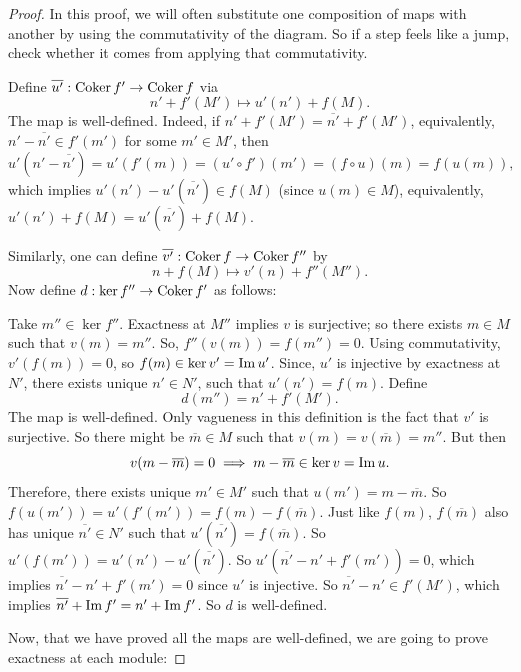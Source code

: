 \begin{proof}
    In this proof, we will often substitute one composition of maps with another by using the commutativity of the diagram. So if a step feels like a jump, check whether it comes from applying that commutativity.

    Define \( \overline{u'}: \operatorname{Coker} f' \to \operatorname{Coker} f \) via
    \[
        n' + f'(M') \mapsto u'(n') + f(M).
    \]
    The map is well-defined. Indeed, if \( n' + f'(M') = \overline{n'} + f'(M') \), equivalently, \( n' - \overline{n'} \in f'(m')\) for some \( m' \in M' \), then
    \[ 
        u'(n' - \overline{n'}) = u'(f'(m)) = (u' \circ f')(m') = (f \circ u)(m) = f(u(m)),
    \]
    which implies \( u'(n') - u'(\overline{n'}) \in f(M) \) (since \( u(m) \in M \)), equivalently, \( u'(n') + f(M) = u'(\overline{n'}) + f(M)\).

    Similarly, one can define \( \overline{v'}: \operatorname{Coker} f \to \operatorname{Coker} f'' \) by
    \[
        n + f(M) \mapsto v'(n) + f''(M'').
    \]
    Now define \( d: \ker f'' \to \operatorname{Coker} f' \) as follows:

    Take \( m'' \in \ker f'' \). Exactness at \( M'' \) implies  \( v \) is surjective; so there exists  \( m \in M \) such that  \( v(m) = m'' \). So,  \( f''(v(m)) = f(m'') = 0 \). Using commutativity,  \( v' ( f(m)) = 0 \), so  \( f(m) \in \ker v' = \operatorname{Im} u'\). Since, \( u' \) is injective by exactness at  \( N' \), there exists unique  \( n' \in N' \), such that  \( u'(n') = f(m) \). Define
    \[
        d(m'') = n' + f'(M').
    \]
    The map is well-defined. Only vagueness in this definition is the fact that \( v' \) is surjective. So there might be \( \overline{m} \in M \) such that \( v(m) = v(\overline{m}) = m'' \). But then
    \[
        v(m - \overline{m}) = 0 \implies m - \overline{m} \in \ker v = \operatorname{Im} u.
    \]
    Therefore, there exists unique \( m' \in M'\) such that  \( u(m') = m - \overline{m} \). So \( f(u(m')) = u'(f'(m')) = f(m) - f(\overline{m}) \). Just like \( f(m) \),  \( f(\overline{m}) \) also has unique \( \overline{n'} \in N' \) such that \( u'(\overline{n'}) = f(\overline{m}) \). So \( u'(f(m')) = u'(n') - u'(\overline{n'}) \). So \( u'(\overline{n'} - n' + f'(m')) = 0 \), which implies \( \overline{n'} - n' + f'(m') = 0 \) since \( u' \) is injective. So  \( \overline{n'} - n' \in f'(M') \), which implies \( \overline{n'} + \operatorname{Im} f' = n' + \operatorname{Im} f' \). So \( d \) is well-defined.

    Now, that we have proved all the maps are well-defined, we are going to prove exactness at each module:


\end{proof}
